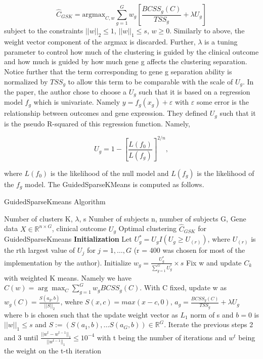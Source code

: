 \documentclass{statsoc}
\newcommand{\RR}{\mathbb{R}}
\begin{document}
\begin{equation}
    \hat{C}_{GSK} = \textrm{argmax}_{C,w} \sum_{g=1}^G w_g \left[ \frac{BCSS_g(C)}{TSS_g} + \lambda U_g  \right]
\end{equation}
subject to the constraints $||w||_2 \leq 1$, $||w||_1 \leq s$, $w \geq 0$. Similarly to above, the weight vector component of the argmax is discarded. Further, $\lambda$ is a tuning parameter to control how much of the clustering is guided by the clinical outcome and how much is guided by how much gene g affects the clustering separation. Notice further that the term corresponding to gene g separation ability is normalized by $TSS_g$ to allow this term to be comparable with the scale of $U_g$.  In the paper, the author chose to choose a $U_g$ such that it is based on a regression model $f_g$ which is univariate. Namely $y = f_g(x_g) + \varepsilon$ with $\varepsilon$ some error is the relationship between outcomes and gene expression. They defined $U_g$ such that it is the pseudo R-squared of this regression function. Namely,

\begin{equation*}
    U_g = 1- \left[\frac{L(f_0)}{L(f_g)} \right]^{2/n},
\end{equation*}

where $L(f_0)$ is the likelihood of the null model and $L(f_g)$ is the likelihood of the $f_g$ model. The GuidedSparseKMeans is computed as follows.

\begin{algorithm}
    \caption{GuidedSparseKmeans Algorithm}
    \begin{algorithmic}[1]
        \REQUIRE Number of clusters K, $\lambda$, s
        \INPUT Number of subjects n, number of subjects G, Gene data $X \in \RR^{n\times G}$, clinical outcome $U_g$
        \OUTPUT Optimal clustering $\hat{C}_{GSK}$ for GuidedSparseKmeans
        \STATE \textbf{Initialization} Let $U_g^* = U_g I(U_g \geq U_{(r)})$, where $U_{(r)}$ is the rth largest value of $U_j$ for $j = 1,\ldots, G$ (r = 400 was chosen for most of the implementation by the author). Initialize $w_g = \frac{U_g^*}{\sum_{g=1}^G U_g^*} \times s$
        \STATE Fix w and update $C_k$ with weighted K means. Namely we have $C(w) = \arg \max_C \sum_{g=1}^G w_g BCSS_g(C)$. 
        \STATE With C fixed, update w as $w_g(C) = \frac{S(a_g, b)}{||S||_2}$, wehre $S(x,c) = max(x-c, 0)$, $a_g = \frac{BCSS_g(C)}{TSS_g} + \lambda U_g$ where b is chosen such that the update weight vector as $L_1$ norm of s and $b=0$ is $||w||_1 \leq s$ and $S := (S(a_1,b), \ldots S(a_G, b)) \in \RR^G$. 
        \STATE Iterate the previous steps 2 and 3 until $\frac{||w^t - w^{t-1}||_1}{||w^{t-1}||_1} \leq 10^{-4}$ with t being the number of iterations and $w^t$ being the weight on the t-th iteration   
    \end{algorithmic}
\end{algorithm}
\end{document}
